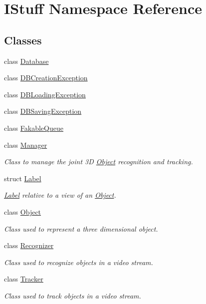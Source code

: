 \hypertarget{namespace_i_stuff}{\section{I\-Stuff Namespace Reference}
\label{namespace_i_stuff}
}
\subsection*{Classes}
\begin{DoxyCompactItemize}
\item 
class \hyperlink{class_i_stuff_1_1_database}{Database}
\item 
class \hyperlink{class_i_stuff_1_1_d_b_creation_exception}{D\-B\-Creation\-Exception}
\item 
class \hyperlink{class_i_stuff_1_1_d_b_loading_exception}{D\-B\-Loading\-Exception}
\item 
class \hyperlink{class_i_stuff_1_1_d_b_saving_exception}{D\-B\-Saving\-Exception}
\item 
class \hyperlink{class_i_stuff_1_1_fakable_queue}{Fakable\-Queue}
\item 
class \hyperlink{class_i_stuff_1_1_manager}{Manager}
\begin{DoxyCompactList}\small\item\em Class to manage the joint 3\-D \hyperlink{class_i_stuff_1_1_object}{Object} recognition and tracking. \end{DoxyCompactList}\item 
struct \hyperlink{struct_i_stuff_1_1_label}{Label}
\begin{DoxyCompactList}\small\item\em \hyperlink{struct_i_stuff_1_1_label}{Label} relative to a view of an \hyperlink{class_i_stuff_1_1_object}{Object}. \end{DoxyCompactList}\item 
class \hyperlink{class_i_stuff_1_1_object}{Object}
\begin{DoxyCompactList}\small\item\em Class used to represent a three dimensional object. \end{DoxyCompactList}\item 
class \hyperlink{class_i_stuff_1_1_recognizer}{Recognizer}
\begin{DoxyCompactList}\small\item\em Class used to recognize objects in a video stream. \end{DoxyCompactList}\item 
class \hyperlink{class_i_stuff_1_1_tracker}{Tracker}
\begin{DoxyCompactList}\small\item\em Class used to track objects in a video stream. \end{DoxyCompactList}\end{DoxyCompactItemize}
